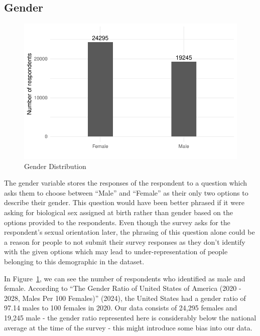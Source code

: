 \documentclass[
  letterpaper,
  DIV=11,
  numbers=noendperiod]{scrartcl}
\begin{document}
\hypertarget{sec-data-gender}{%
\subsection{Gender}\label{sec-data-gender}}

\begin{figure}

{\centering \includegraphics{paper_files/figure-pdf/fig-gender-histogram-1.pdf}

}

\caption{\label{fig-gender-histogram}Gender Distribution}

\end{figure}

The gender variable stores the responses of the respondent to a question
which asks them to choose between ``Male'' and ``Female'' as their only
two options to describe their gender. This question would have been
better phrased if it were asking for biological sex assigned at birth
rather than gender based on the options provided to the respondents.
Even though the survey asks for the respondent's sexual orientation
later, the phrasing of this question alone could be a reason for people
to not submit their survey responses as they don't identify with the
given options which may lead to under-representation of people belonging
to this demographic in the dataset.

In Figure~\ref{fig-gender-histogram}, we can see the number of
respondents who identified as male and female. According to {``The
Gender Ratio of United States of America (2020 - 2028, Males Per 100
Females)''} (2024), the United States had a gender ratio of 97.14 males
to 100 females in 2020. Our data consists of 24,295 females and 19,245
male - the gender ratio represented here is considerably below the
national average at the time of the survey - this might introduce some
bias into our data.
\end{document}
